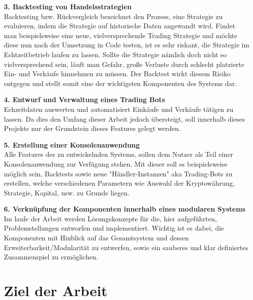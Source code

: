 \documentclass[oneside]{ausarbeitung}
\begin{document}
\textbf{3. Backtesting von Handelsstrategien} \\
Backtesting bzw. Rückvergleich bezeichnet den Prozess, eine Strategie
zu evaluieren, indem die Strategie auf historische Daten angewandt
wird\cite{backtesting_definition}. Findet man beispielsweise eine neue,
vielversprechende Trading
Strategie und möchte diese nun nach der Umsetzung in Code testen, ist
es sehr riskant, die Strategie im Echtzeitbetrieb laufen zu lassen.
Sollte die Strategie nämlich doch nicht so vielversprechend sein,
läuft man Gefahr, große Verluste durch schlecht platzierte Ein- und
Verkäufe hinnehmen zu müssen. Der Backtest wirkt diesem Risiko
entgegen und stellt somit eine der wichtigsten Komponenten des Systems
dar.

\textbf{4. Entwurf und Verwaltung eines Trading Bots} \\
Echzeitdaten auswerten und automatisiert Einkäufe und Verkäufe
tätigen zu lassen. Da dies den Umfang dieser Arbeit jedoch
übersteigt, soll innerhalb dieses Projekts nur der Grundstein dieses
Features gelegt werden.

\textbf{5. Erstellung einer Konsolenanwendung} \\
Alle Features des zu entwickelnden Systems, sollen dem Nutzer als Teil
einer Konsolenanwendung zur Verfügung stehen. Mit dieser soll es
beispielsweise möglich sein, Backtests sowie neue
"Händler-Instanzen" aka Trading-Bots zu erstellen, welche
verschiedenen Parametern wie Auswahl der Kryptowährung, Strategie,
Kapital, usw. zu Grunde liegen.

\textbf{6. Verknüpfung der Komponenten innerhalb eines modularen Systems} \\
Im laufe der Arbeit werden Lösungskonzepte für die, hier
aufgeführten, Problemstellungen entworfen und implementiert. Wichtig
ist es dabei, die Komponenten mit Hinblick auf das Gesamtsystem und
dessen Erweiterbarkeit/Modularität zu entwerfen, sowie ein sauberes
und klar definiertes Zusammenspiel zu ermöglichen. 

\section{Ziel der Arbeit}
\label{sec:ziel}
\end{document}
